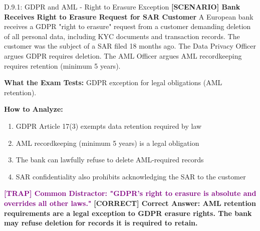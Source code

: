 \documentclass[11pt,a4paper]{beamer}
\newcommand{\trap}[1]{\textcolor{purple}{\textbf{[TRAP] #1}}}
\newcommand{\correct}[1]{\textcolor{green!50!black}{\textbf{[CORRECT] #1}}}
\newcommand{\scenario}[1]{\textcolor{blue!70!black}{\textbf{[SCENARIO] #1}}}
\begin{document}
\begin{frame}{D.9.1: GDPR and AML - Right to Erasure Exception}
	\scenario{Bank Receives Right to Erasure Request for SAR Customer}
	A European bank receives a GDPR "right to erasure" request from a customer demanding deletion of all personal data, including KYC documents and transaction records. The customer was the subject of a SAR filed 18 months ago. The Data Privacy Officer argues GDPR requires deletion. The AML Officer argues AML recordkeeping requires retention (minimum 5 years).
	
	\vspace{0.1cm}
	\textbf{What the Exam Tests:} GDPR exception for legal obligations (AML retention).
	
	\vspace{0.1cm}
	\textbf{How to Analyze:}
	\begin{enumerate}
		\item GDPR Article 17(3) exempts data retention required by law
		\item AML recordkeeping (minimum 5 years) is a legal obligation
		\item The bank can lawfully refuse to delete AML-required records
		\item SAR confidentiality also prohibits acknowledging the SAR to the customer
	\end{enumerate}
	
	\trap{Common Distractor: "GDPR's right to erasure is absolute and overrides all other laws."}
	\correct{Correct Answer: AML retention requirements are a legal exception to GDPR erasure rights. The bank may refuse deletion for records it is required to retain.}
\end{frame}
\end{document}

